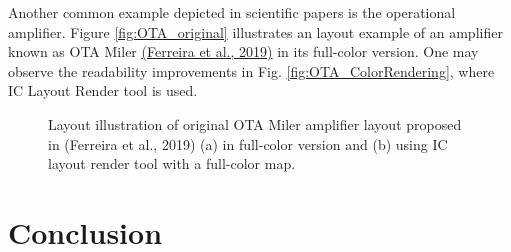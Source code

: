 \documentclass[10pt,a4paper,onecolumn]{article}
\begin{document}
Another common example depicted in scientific papers is the operational
amplifier. Figure \ref{fig:OTA_original} illustrates an layout example of an amplifier
known as OTA Miler \hyperlink{ref-Ferreira2019b}{(Ferreira et al., 2019)} in its full-color version.
One may observe the readability improvements in Fig. \ref{fig:OTA_ColorRendering}, where IC
Layout Render tool is used.
\begin{figure}[ht]
 \begin{center}
   \caption{Layout illustration of original OTA Miler amplifier layout
proposed in (Ferreira et al., 2019) (a) in full-color version and (b)
using IC layout render tool with a full-color map.}
 \end{center}
\end{figure}


\hypertarget{conclusion}{%
\section{Conclusion}\label{conclusion}}
\end{document}
